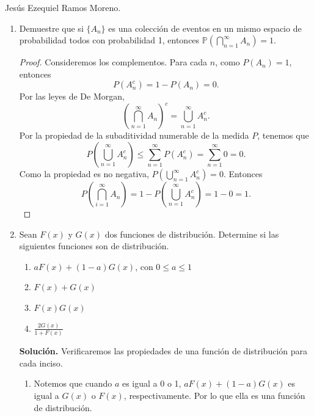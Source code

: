 \documentclass{article}
\newcommand{\ntarea}{1}
\begin{document}
\pagestyle{fancy}
\rhead{Tarea \ntarea}

\large{Jesús Ezequiel Ramos Moreno.}
\begin{enumerate}
    \item[2.] Demuestre que si \(\{A_n\}\) es una colección de eventos en un mismo espacio de probabilidad todos con probabilidad 1, entonces \(\mathbb{P}(\bigcap_{n=1}^{\infty} A_n) = 1\).
    \begin{proof}
        Consideremos los complementos. Para cada \(n\), como \(P(A_n) = 1\), entonces
        \[
        P(A_n^c) = 1 - P(A_n) = 0.
        \]
        Por las leyes de De Morgan,
        \[
        {\left(\bigcap_{n = 1}^\infty A_n\right)}^c = \bigcup_{n = 1}^\infty A_n ^c.
        \]
        Por la propiedad de la subaditividad numerable de la medida \(P\), tenemos que
        \[
        P\left(\bigcup_{n = 1} ^\infty A_n ^c\right) \leq \sum_{n = 1}^{\infty}P(A_n^c) = \sum_{n=1}^{\infty}0 = 0.
        \]
        Como la propiedad es no negativa, \(P\left(\bigcup_{n = 1} ^\infty A_n ^c\right) = 0\). Entonces 
        \[
        P\left(\bigcap_{i = 1}^\infty A_n\right) = 1 - P\left(\bigcup_{n = 1} ^\infty A_n ^c\right) = 1 - 0 = 1.
        \]
    \end{proof}
    \item[4.] Sean \(F(x)\) y \(G(x)\) dos funciones de distribución. Determine si las siguientes funciones son de distribución.
    \begin{enumerate}[label={(\roman*)}]
        \item \(aF(x) + (1 - a)G(x)\), con \(0 \leq a \leq 1\)
        \item \(F(x) + G(x)\)
        \item \(F(x)G(x)\)
        \item \(\frac{2G(x)}{1 + F(x)}\)
    \end{enumerate}
    \textbf{Solución.} Verificaremos las propiedades de una función de distribución para cada inciso.
    \begin{enumerate}[label={(\roman*)}]
        \item Notemos que cuando \(a\) es igual a 0 o 1, \(aF(x) + (1 - a)G(x)\) es igual a \(G(x)\) o \(F(x)\), respectivamente. Por lo que ella es una función de distribución.
        

\end{enumerate}
\end{enumerate}
\end{document}
